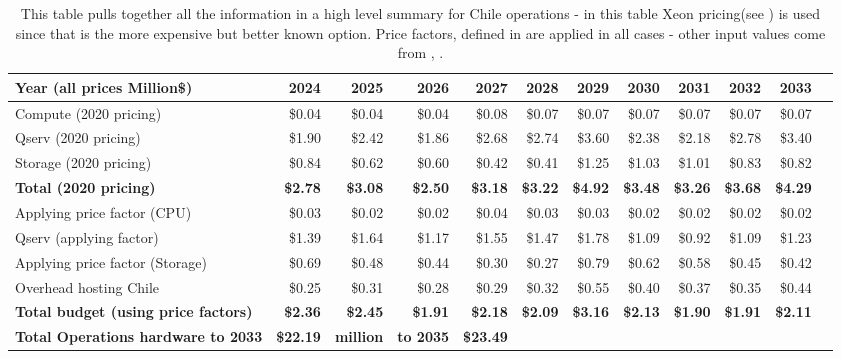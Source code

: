\tiny \begin{longtable} { |p{}  |r  |r  |r  |r  |r  |r  |r  |r  |r  |r  |r |} 
\caption{This table pulls together all the information in a high level summary for Chile operations - in this table Xeon pricing(see ) is used since that is the more expensive but better known option. Price factors, defined in  are applied in all cases - other input values come from , .
 \label{tab:opsSumChile}}\\ 
\hline 
\textbf{Year  (all prices Million\$)}&\textbf{2024}&\textbf{2025}&\textbf{2026}&\textbf{2027}&\textbf{2028}&\textbf{2029}&\textbf{2030}&\textbf{2031}&\textbf{2032}&\textbf{2033} \\ \hline
{Compute (2020 pricing)}&{\$0.04}&{\$0.04}&{\$0.04}&{\$0.08}&{\$0.07}&{\$0.07}&{\$0.07}&{\$0.07}&{\$0.07}&{\$0.07} \\ \hline
{Qserv (2020 pricing)}&{\$1.90}&{\$2.42}&{\$1.86}&{\$2.68}&{\$2.74}&{\$3.60}&{\$2.38}&{\$2.18}&{\$2.78}&{\$3.40} \\ \hline
{Storage (2020 pricing)}&{\$0.84}&{\$0.62}&{\$0.60}&{\$0.42}&{\$0.41}&{\$1.25}&{\$1.03}&{\$1.01}&{\$0.83}&{\$0.82} \\ \hline
\textbf{Total (2020 pricing)}&\textbf{\$2.78}&\textbf{\$3.08}&\textbf{\$2.50}&\textbf{\$3.18}&\textbf{\$3.22}&\textbf{\$4.92}&\textbf{\$3.48}&\textbf{\$3.26}&\textbf{\$3.68}&\textbf{\$4.29} \\ \hline
{Applying price factor (CPU)}&{\$0.03}&{\$0.02}&{\$0.02}&{\$0.04}&{\$0.03}&{\$0.03}&{\$0.02}&{\$0.02}&{\$0.02}&{\$0.02} \\ \hline
{Qserv (applying factor)}&{\$1.39}&{\$1.64}&{\$1.17}&{\$1.55}&{\$1.47}&{\$1.78}&{\$1.09}&{\$0.92}&{\$1.09}&{\$1.23} \\ \hline
{Applying price factor (Storage)}&{\$0.69}&{\$0.48}&{\$0.44}&{\$0.30}&{\$0.27}&{\$0.79}&{\$0.62}&{\$0.58}&{\$0.45}&{\$0.42} \\ \hline
{Overhead hosting Chile}&{\$0.25}&{\$0.31}&{\$0.28}&{\$0.29}&{\$0.32}&{\$0.55}&{\$0.40}&{\$0.37}&{\$0.35}&{\$0.44} \\ \hline
\textbf{Total budget (using price factors)}&\textbf{\$2.36}&\textbf{\$2.45}&\textbf{\$1.91}&\textbf{\$2.18}&\textbf{\$2.09}&\textbf{\$3.16}&\textbf{\$2.13}&\textbf{\$1.90}&\textbf{\$1.91}&\textbf{\$2.11} \\ \hline
\textbf{Total Operations hardware to 2033}&\textbf{\$22.19}&\textbf{million}&\textbf{to 2035}&\textbf{\$23.49}&&&&&& \\ \hline
\end{longtable} \normalsize
